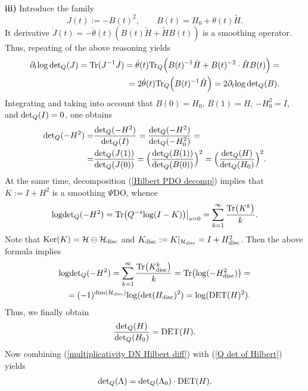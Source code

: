\documentclass{amsart}
\begin{document}
{\bf iii)} Introduce the family 
$$J(t):=-B(t)^2, \qquad B(t)=H_0+\theta(t)\tilde{H}.$$
It derivative $\dot{J}(t)=-\dot{\theta}(t)(B(t)\tilde{H}+\tilde{H}B(t))$ is a smoothing operator. Thus, repeating of the above reasoning yields
\begin{align*}
\partial_t{\rm log}\,{\rm det}_Q(J)={\rm Tr}(J^{-1}\dot{J})=\dot{\theta}(t){\rm Tr}_Q\Big(B(t)^{-1}\tilde{H}+B(t)^{-2}\cdot\tilde{H}B(t)\Big)=\\
=2\dot{\theta}(t){\rm Tr}_Q\Big(B(t)^{-1}\tilde{H}\Big)=2\partial_t{\rm log}\,{\rm det}_Q(B).
\end{align*}
Integrating and taking into account that $B(0)=H_0$, $B(1)=H$, $-H_0^2=I$, and ${\rm det}_Q(I)=0$, one obtains
\begin{align*}
{\rm det}_Q(-H^2)=&\frac{{\rm det}_Q(-H^2)}{{\rm det}_Q(I)}=\frac{{\rm det}_Q(-H^2)}{{\rm det}_Q(-H_0^2)}=\\
=&\frac{{\rm det}_Q(J(1))}{{\rm det}_Q(J(0))}=\Big(\frac{{\rm det}_Q(B(1))}{{\rm det}_Q(B(0))}\Big)^2=\Big(\frac{{\rm det}_Q(H)}{{\rm det}_Q(H_0)}\Big)^2.
\end{align*}
At the same time, decomposition (\ref{Hilbert PDO decomp}) implies that $K:=I+H^2$ is a smoothing $\Psi$DO, whence
\begin{align*}
{\rm log}{\rm det}_Q(-H^2)={\rm Tr}\big(Q^{-s}{\rm log}(I-K)\big)\big|_{s=0}=\sum_{k=1}^{\infty}\frac{{\rm Tr}\big(K^k\big)}{k}.
\end{align*}
Note that ${\rm Ker}(K)=\mathcal{H}\ominus\mathcal{H}_{\rm disc}$ and $K_{\rm disc}:=K|_{\mathcal{H}_{\rm disc}}=I+H_{\rm disc}^2$. Then the above formula implies
\begin{align*}
{\rm log}{\rm det}_Q(-H^2)=\sum_{k=1}^{\infty}\frac{{\rm Tr}\big(K_{\rm disc}^k\big)}{k}={\rm Tr}\big({\rm log}(-H_{\rm disc}^2)\big)=\\
=(-1)^{{\rm dim}(\mathcal{H}_{\rm disc})}{\rm log}({\rm det}(H_{\rm disc})^2)={\rm log}({\rm DET}(H)^2).
\end{align*}
Thus, we finally obtain
\begin{equation}
\label{Q det of Hilbert}
\frac{{\rm det}_Q(H)}{{\rm det}_Q(H_0)}={\rm DET}(H).
\end{equation}
Now combining (\ref{multiplicativity DN Hilbert diff}) with (\ref{Q det of Hilbert}) yields
\begin{align}
\label{Q-multiplicativity}
{\rm det}_Q(\Lambda)={\rm det}_Q(\Lambda_0)\cdot{\rm DET}(H).
\end{align}
\end{document}
